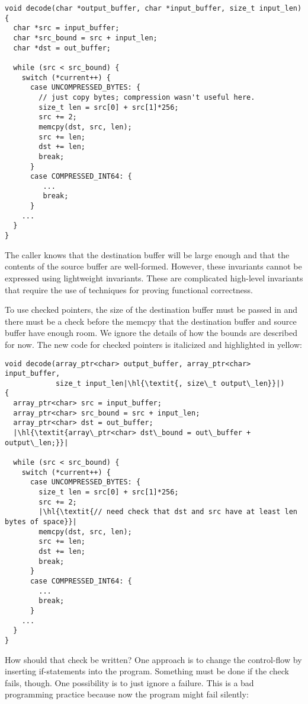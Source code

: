 \begin{lstlisting}
void decode(char *output_buffer, char *input_buffer, size_t input_len)
{
  char *src = input_buffer;
  char *src_bound = src + input_len;
  char *dst = out_buffer;

  while (src < src_bound) {
    switch (*current++) {
      case UNCOMPRESSED_BYTES: {
        // just copy bytes; compression wasn't useful here.
        size_t len = src[0] + src[1]*256;
        src += 2;
        memcpy(dst, src, len);
        src += len;
        dst += len;
        break;
      }
      case COMPRESSED_INT64: {
         ...
         break;
      }
    ...
  }
}
\end{lstlisting}

The caller knows that the destination buffer will be large enough and
that the contents of the source buffer are well-formed. However, these
invariants cannot be expressed using lightweight invariants. These are
complicated high-level invariants that require the use of techniques for
proving functional correctness.

To use checked pointers, the size of the destination buffer must be passed
in and there must be a check before the memcpy that the destination
buffer and source buffer have enough room. We ignore the details of how
the bounds are described for now.    The new code for checked pointers is italicized
and highlighted in yellow:
\begin{lstlisting}[escapechar=\|]
void decode(array_ptr<char> output_buffer, array_ptr<char> input_buffer,
            size_t input_len|\hl{\textit{, size\_t output\_len}}|)
{
  array_ptr<char> src = input_buffer;
  array_ptr<char> src_bound = src + input_len;
  array_ptr<char> dst = out_buffer;
  |\hl{\textit{array\_ptr<char> dst\_bound = out\_buffer + output\_len;}}|

  while (src < src_bound) {
    switch (*current++) {
      case UNCOMPRESSED_BYTES: {
        size_t len = src[0] + src[1]*256;
        src += 2;
        |\hl{\textit{// need check that dst and src have at least len bytes of space}}|
        memcpy(dst, src, len);
        src += len;
        dst += len;  
        break;
      }
      case COMPRESSED_INT64: {
        ...
        break;
      }
    ...
  }
}
\end{lstlisting}

How should that check be written? One approach is to change the
control-flow by inserting if-statements into the program. Something must
be done if the check fails, though. One possibility is to just ignore a
failure. This is a bad programming practice because now the program might
fail silently:

